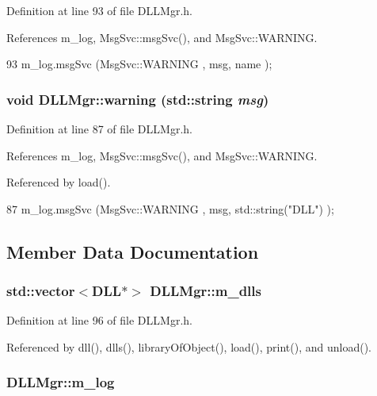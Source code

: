 Definition at line 93 of file DLLMgr.h.

References m\_\-log, MsgSvc::msgSvc(), and MsgSvc::WARNING.


\begin{DoxyCode}
93 { m_log.msgSvc (MsgSvc::WARNING , msg, name ); }
\end{DoxyCode}
\hypertarget{classDLLMgr_ad8a177de233cda457b5566e4ff3bb50e}{
\subsubsection[{warning}]{\setlength{\rightskip}{0pt plus 5cm}void DLLMgr::warning (std::string {\em msg})}}
\label{classDLLMgr_ad8a177de233cda457b5566e4ff3bb50e}


Definition at line 87 of file DLLMgr.h.

References m\_\-log, MsgSvc::msgSvc(), and MsgSvc::WARNING.

Referenced by load().


\begin{DoxyCode}
87 { m_log.msgSvc (MsgSvc::WARNING , msg, std::string("DLL") ); }
\end{DoxyCode}


\subsection{Member Data Documentation}
\hypertarget{classDLLMgr_a5bd713edea21d64f32aa71162bca581a}{
\subsubsection[{m\_\-dlls}]{\setlength{\rightskip}{0pt plus 5cm}std::vector$<${\bf DLL}$\ast$$>$ {\bf DLLMgr::m\_\-dlls}}}
\label{classDLLMgr_a5bd713edea21d64f32aa71162bca581a}


Definition at line 96 of file DLLMgr.h.

Referenced by dll(), dlls(), libraryOfObject(), load(), print(), and unload().\hypertarget{classDLLMgr_a64b523faed64378451ee76f6fbf0800d}{
\subsubsection[{m\_\-log}]{ {\bf DLLMgr::m\_\-log}}}
\label{classDLLMgr_a64b523faed64378451ee76f6fbf0800d}



